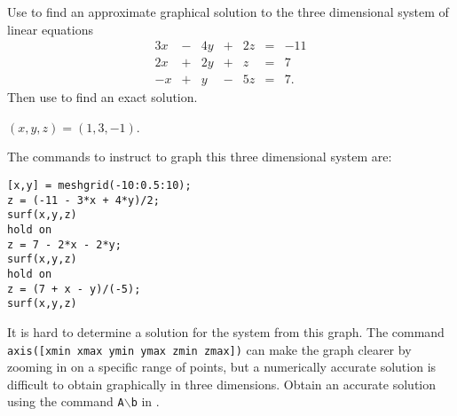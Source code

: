 \documentclass{ximera}
\begin{document}
\begin{computerExercise} \label{c2.2.3}
Use \Matlab to find an approximate graphical solution to the
three dimensional system of linear equations
\[
\begin{array}{rcrcrcr}
 3x & - & 4y & + & 2z  & = & -11\\
 2x & + & 2y & + &  z  & = &   7\\
 -x & + &  y & - & 5z  & = &   7.
\end{array}
\]
Then use \Matlab to find an exact solution.

\begin{solution}

\ans $(x,y,z) = (1,3,-1)$.

\soln The commands to instruct \Matlab to graph this three dimensional
system are:
\begin{verbatim}
[x,y] = meshgrid(-10:0.5:10);
z = (-11 - 3*x + 4*y)/2;
surf(x,y,z)
hold on 
z = 7 - 2*x - 2*y;
surf(x,y,z)
hold on
z = (7 + x - y)/(-5);
surf(x,y,z)
\end{verbatim}
It is hard to determine a solution for the system from this graph.
The command {\tt axis([xmin xmax ymin ymax zmin zmax])} can make the
graph clearer by zooming in on a specific range of points, but a
numerically accurate solution is difficult to obtain graphically in
three dimensions.  Obtain an accurate solution using the command
{\tt A}$\backslash${\tt b} in \Matlabp.

\end{solution}
\end{computerExercise}
\end{document}
